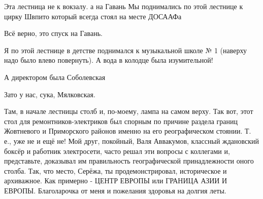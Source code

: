 
Эта лестница не к вокзалу. а на Гавань Мы поднимались по этой лестнице к цирку
Швпито который всегда стоял на месте ДОСААФа


Всё верно, это спуск на Гавань.


Я по этой лестнице в детстве поднимался к музыкальной школе № 1 (наверху надо
было влево повернуть). А вода в колодце была изумительной!


А директором была Соболевская


Зато у нас, сука, Мялковская.


Там, в начале лестницы столб и, по-моему, лампа на самом верху. Так вот, этот стол
для ремонтников-электриков был спорным по причине раздела границ Жовтневого и
Приморского районов именно на его реографическом стоянии. Т. е., уже не и ещё не!
Мой друг, покойный, Валя Аввакумов, классный ждановский боксёр и работник
электросети, часто решал эти вопросы с коллегами и, представьте, доказывал им
правильность географической принадлежности оного столба. Так, что место, Серёжа, ты
продемонстрировал, историческое и архиважное. Как примерно - ЦЕНТР ЕВРОПЫ или
ГРАНИЦА АЗИИ И ЕВРОПЫ. Благоларочка от меня и пожелания здоровья на долгия леты.
